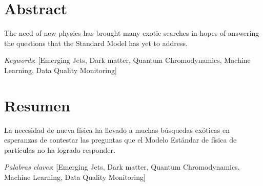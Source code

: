 \chapter*{Abstract}

The need of new physics has brought many exotic searches in hopes of answering the questions that the Standard Model has yet to address.

\vspace*{1cm}

\textit{Keywords}:  [Emerging Jets, Dark matter, Quantum Chromodynamics, Machine Learning, Data Quality Monitoring]


\chapter*{Resumen}
La necesidad de nueva física ha llevado a muchas búsquedas exóticas en esperanzas de contestar las preguntas que el Modelo Estándar de física de partículas no ha logrado responder.


\vspace*{1cm}

\textit{Palabras claves}:  [Emerging Jets, Dark matter, Quantum Chromodynamics, Machine Learning, Data Quality Monitoring]
